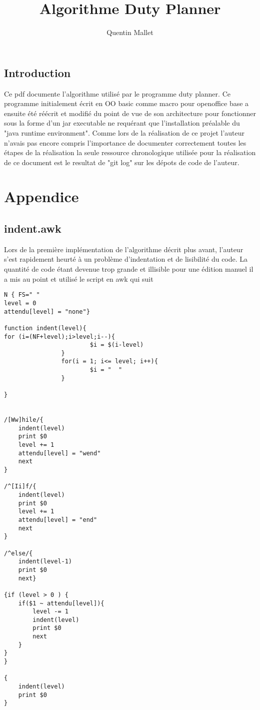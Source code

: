 \documentclass[11pt]{report}
\begin{document}
\title{Algorithme Duty Planner}

\author{Quentin Mallet}


\maketitle

\tableofcontents

\section{Introduction}
Ce pdf documente l'algorithme utilisé par le programme duty planner.
Ce programme initialement écrit en OO basic comme macro pour openoffice base a ensuite été réécrit et modifié du point de vue de son architecture pour fonctionner sous la forme d'un jar executable ne requérant que l'installation préalable du "java runtime environment". 
Comme lors de la réalisation de ce projet l'auteur n'avais pas encore compris l'importance de documenter correctement toutes les étapes de la réalisation la seule ressource chronologique utilisée pour la réalisation de ce document est le resultat de "git log" sur les dépots de code de l'auteur.

\chapter{Appendice}
\section{indent.awk}
Lors de la première implémentation de l'algorithme décrit plus avant, l'auteur s'est rapidement heurté à un problème d'indentation et de lisibilité du code. La quantité de code étant devenue trop grande et illisible pour une édition manuel il a mis au point et utilisé le script en awk qui suit
\begin{verbatim}
N { FS=" " 
level = 0
attendu[level] = "none"}

function indent(level){
for (i=(NF+level);i>level;i--){
                        $i = $(i-level)
                }
                for(i = 1; i<= level; i++){
                        $i = "  "
                }

}


/[Ww]hile/{
	indent(level)
	print $0
	level += 1
	attendu[level] = "wend"
	next
}

/^[Ii]f/{
	indent(level)
	print $0
	level += 1
	attendu[level] = "end"
	next
}

/^else/{
	indent(level-1)
	print $0
	next}

{if (level > 0 ) {
	if($1 ~ attendu[level]){
		level -= 1
		indent(level)
		print $0
		next
	}
}
}

{
	indent(level)
	print $0
}
\end{verbatim}
\end{document}
